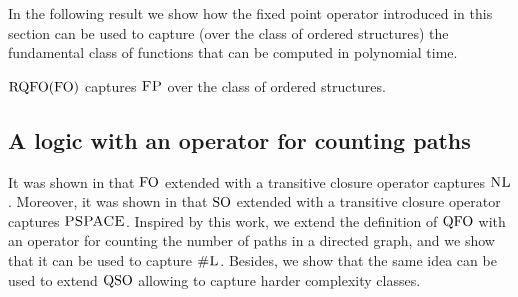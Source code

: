 In the following result we show how the fixed point operator introduced in this section can be used to capture (over the class of ordered structures) the fundamental class of functions that can be computed in polynomial time.
\begin{theorem} \label{rqfo-fo-cap}
	${\rm RQFO}({\rm FO})$ captures $\text{\sc FP}$ over the class of ordered structures.
\end{theorem}


%
%
%


\subsection{A logic with an operator for counting paths}

It was shown in \cite{I86,I88} that ${\rm FO}$ extended with a transitive closure operator captures $\text{\sc NL}$. Moreover, it was shown in \cite{I83} that ${\rm SO}$ extended with a transitive closure operator captures $\text{\sc PSPACE}$. Inspired by this work, we extend the definition of ${\rm QFO}$ with an operator for counting the number of paths in a directed graph, and we show that it can be used to capture $\text{\sc \#L}$. Besides, we show that the same idea can be used to extend ${\rm QSO}$ allowing to capture harder complexity classes. 


